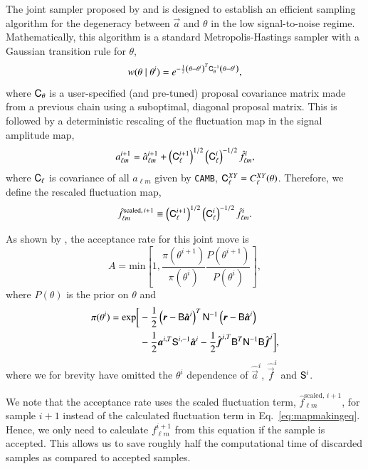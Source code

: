 \documentclass[twocolumn]{../common/aa}
\def\camb{\texttt{CAMB}}
\newcommand{\B}[0]{\tens{B}}
\renewcommand{\C}[0]{\tens{C}}
\renewcommand{\a}[0]{\vec{a}}
\newcommand{\f}[0]{\vec{f}}
\newcommand{\N}[0]{\tens{N}}
\renewcommand{\S}[0]{\tens{S}}
\renewcommand{\r}[0]{\vec{r}}
\begin{document}
The joint sampler proposed by \citet{jewell:2009} and \citet{racine:2016} is designed to establish an efficient sampling algorithm for the degeneracy between $\a$ and $\theta$ in the low signal-to-noise regime. Mathematically, this algorithm is a standard Metropolis-Hastings sampler with a Gaussian transition rule for $\theta$,
\begin{equation}
w(\theta \mid\theta^i) = e^{-\frac12 \left(\theta - \theta^i \right)^T \C_{\theta}^{-1}\left(\theta - \theta^i \right)},
\end{equation}
where $\C_{\theta}$ is a user-specified (and pre-tuned) proposal covariance matrix made from a previous chain using a suboptimal, diagonal proposal matrix. This is followed by a deterministic rescaling of the fluctuation map in the signal amplitude map,
\begin{equation}
    a_{\ell m}^{i+1} = \hat{a}_{\ell m}^{i+1} + \left(\C^{i+1}_{\ell}\right)^{1/2}\left(\C^{i}_{\ell}\right)^{-1/2} \hat{f}_{\ell m}^{i},
\end{equation}
where $\C_\ell$ is covariance of all $a_{\ell m}$ given by \camb, $\C_\ell^{XY}=C_\ell^{XY}(\theta)$.
Therefore, we define the rescaled fluctuation map,
\begin{equation}
  \hat{f}_{\ell m}^{\textrm{scaled},\, i+1} \equiv \left(\C^{i+1}_{\ell}\right)^{1/2}\left(\C^{i}_{\ell}\right)^{-1/2} \hat{f}_{\ell m}^{i}.
\end{equation}

As shown by \citet{racine:2016}, the acceptance rate for this joint move is
\begin{equation}
    \label{eq:acceptance-rate}
    A = \mathrm{min}\left[1, \frac{\pi(\theta^{i+1})}{\pi(\theta^i)} \frac{P(\theta^{i+1})}{P(\theta^i)} \right],
\end{equation}
where $P(\theta)$ is the prior on $\theta$ and
\begin{align}
    \nonumber
    \pi(\theta^{i}) = \mathrm{exp}\bigg[&-\frac12 \left(\r-\B\hat{\a}^i\right)^T \N^{-1}\left(\r-\B\hat{\a}^i\right)\\
    &-\frac12\a^{i,T} \S^{i, -1}\hat{\a}^i -\frac12 \hat{\f}^{i, T}\B^T\N^{-1} \B\hat{\f}^i\bigg],
\end{align}
where we for brevity have omitted the $\theta^i$ dependence of $\hat{\a}^i$, $\hat{\f}^i$ and $\S^i$. 

We note that the acceptance rate uses the scaled fluctuation term, $\hat{f}_{\ell m}^{\textrm{scaled},\, i+1}$, for sample $i+1$ instead of the calculated fluctuation term in Eq.~\eqref{eq:mapmakingeq}. Hence, we only need to calculate $f_{\ell m}^{i+1}$ from this equation if the sample is accepted. This allows us to save roughly half the computational time of discarded samples as compared to accepted samples.
\end{document}
